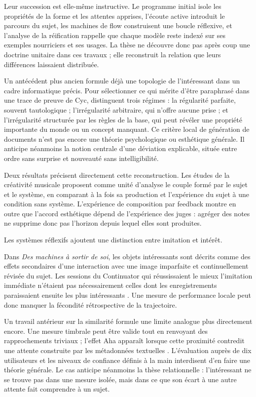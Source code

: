 \documentclass[11pt,a4paper]{article}
\begin{document}
Leur succession est elle-même instructive. Le programme initial isole les
propriétés de la forme et les attentes apprises, l'écoute active introduit le
parcours du sujet, les machines de flow construisent une boucle réflexive, et
l'analyse de la réification rappelle que chaque modèle reste indexé sur ses
exemples nourriciers et ses usages. La thèse ne découvre donc pas après coup une
doctrine unitaire dans ces travaux ; elle reconstruit la relation que leurs
différences laissaient distribuée.

Un antécédent plus ancien formule déjà une topologie de l'intéressant dans un
cadre informatique précis. Pour sélectionner ce qui mérite d'être paraphrasé
dans une trace de preuve de Cyc, \textcite{milipachet1995regularity} distinguent
trois régimes : la régularité parfaite, souvent tautologique ; l'irrégularité
arbitraire, qui n'offre aucune prise ; et l'irrégularité structurée par les
règles de la base, qui peut révéler une propriété importante du monde ou un
concept manquant. Ce critère local de génération de documents n'est pas encore
une théorie psychologique ou esthétique générale. Il anticipe néanmoins la
notion centrale d'une déviation explicable, située entre ordre sans surprise et
nouveauté sans intelligibilité.

Deux résultats précisent directement cette reconstruction. Les études de la
créativité musicale proposent comme unité d'analyse le couple formé par le sujet
et le système, en comparant à la fois sa production et l'expérience du sujet à
une condition sans système. L'expérience de composition par feedback montre en
outre que l'accord esthétique dépend de l'expérience des juges : agréger des
notes ne supprime donc pas l'horizon depuis lequel elles sont produites.

Les systèmes réflexifs ajoutent une distinction entre imitation et intérêt.

Dans \emph{Des machines à sortir de soi}, les objets intéressants sont décrits comme
des effets secondaires d'une interaction avec une image imparfaite et
continuellement révisée du sujet. Les sessions du Continuator qui réussissaient
le mieux l'imitation immédiate n'étaient pas nécessairement celles dont les
enregistrements paraissaient ensuite les plus intéressants
\parencite{pachet2008machines}. Une mesure de performance locale peut donc
manquer la fécondité rétrospective de la trajectoire.

Un travail antérieur sur la similarité formule une limite analogue plus
directement encore. Une mesure timbrale peut être valide tout en renvoyant des
rapprochements triviaux ; l'effet Aha apparaît lorsque cette proximité contredit
une attente construite par les métadonnées textuelles
\parencite{aucouturier2002similarity}. L'évaluation auprès de dix utilisateurs et
les niveaux de confiance définis à la main interdisent d'en faire une théorie
générale. Le cas anticipe néanmoins la thèse relationnelle : l'intéressant ne se
trouve pas dans une mesure isolée, mais dans ce que son écart à une autre attente
fait comprendre à un sujet.
\end{document}
